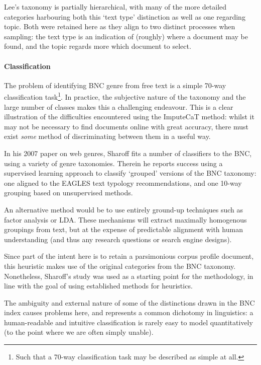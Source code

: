 Lee's taxonomy is partially hierarchical, with many of the more detailed categories harbouring both this `text type' distinction as well as one regarding topic.  Both were retained here as they align to two distinct processes when sampling: the text type is an indication of (roughly) where a document may be found, and the topic regards more which document to select.






\paragraph{Classification}
The problem of identifying BNC genre from free text is a simple 70-way classification task\footnote{Such that a 70-way classification task may be described as simple at all.}.  In practice, the subjective nature of the taxonomy and the large number of classes makes this a challenging endeavour.  This is a clear illustration of the difficulties encountered using the ImputeCaT method: whilst it may not be necessary to find documents online with great accuracy, there must exist \textsl{some} method of discriminating between them in a useful way.



In his 2007 paper on web genres, Sharoff\cite{sharoff2007classifying}%
 fits a number of classifiers to the BNC, using a variety of genre taxonomies.  Therein he reports success using a supervised learning approach to classify `grouped' versions of the BNC taxonomy: one aligned to the EAGLES\cite{EagTcwgCtypeaglespreliminary} text typology recommendations, and one 10-way grouping based on unsupervised methods.

An alternative method would be to use entirely ground-up techniques such as factor analysis or LDA.  These mechanisms will extract maximally homogenous groupings from text, but at the expense of predictable alignment with human understanding (and thus any research questions or search engine designs).

Since part of the intent here is to retain a parsimonious corpus profile document, this heuristic makes use of the original categories from the BNC taxonomy.  Nonetheless, Sharoff's study was used as a starting point for the methodology, in line with the goal of using established methods for heuristics.

The ambiguity and external nature of some of the distinctions drawn in the BNC index causes problems here, and represents a common dichotomy in linguistics: a human-readable and intuitive classification is rarely easy to model quantitatively (to the point where we are often simply unable).

